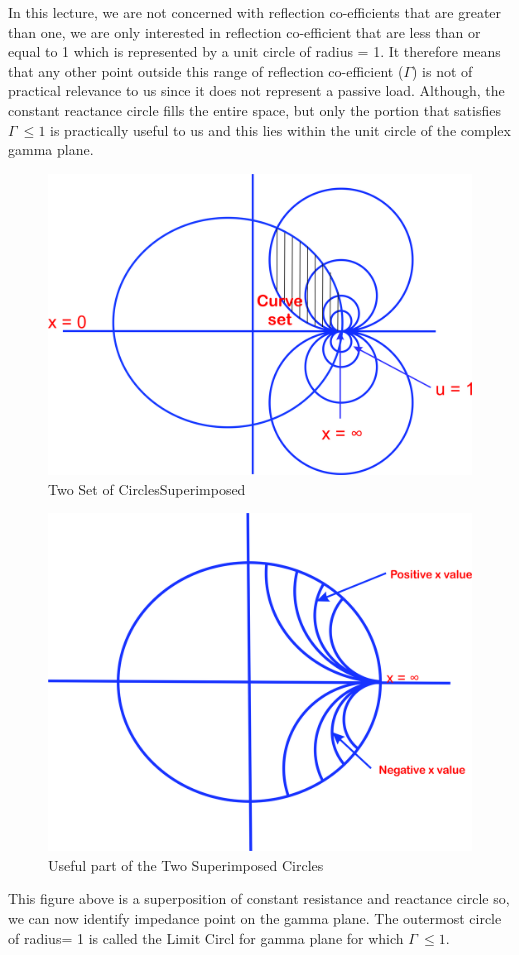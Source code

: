In this lecture, we are not concerned with reflection co-efficients that are greater than one, we are only interested in reflection co-efficient that are less than or equal to 1 which is represented by a unit circle of radius = 1. It therefore means that any other point outside this range of reflection co-efficient ($\Gamma$) is not of practical relevance to us since it does not represent a passive load.  Although, the constant reactance circle fills the entire space, but only the portion that satisfies $ \Gamma\ \leq 1$ is practically useful to us and this lies within the unit circle of the complex gamma plane.
\begin{figure}[h]
\centering
\includegraphics[width=0.5\linewidth]{./graphics/ijnbvcxw}
\caption{Two Set of CirclesSuperimposed}
\label{fig:ijnbvcxw}
\end{figure}
\begin{figure}[h]
\centering
\includegraphics[width=0.5\linewidth]{./graphics/sddfghj}
\caption{Useful part of the Two Superimposed Circles}
\label{fig:sddfghj}
\end{figure}

This figure above is a superposition of constant resistance and reactance circle so, we can now identify impedance point on the gamma plane.  The outermost circle of radius= 1 is called the Limit Circl for gamma plane for which $ \Gamma\ \leq 1$.\\

